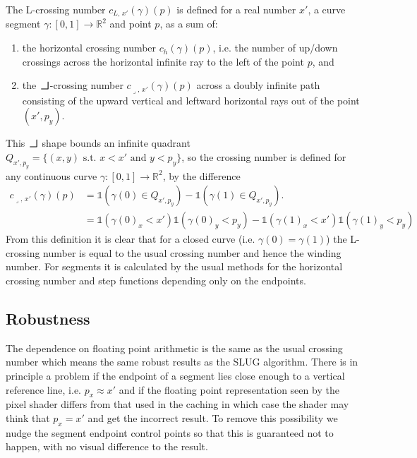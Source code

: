 \documentclass{article}
\newcommand{\backL}{\resizebox{!}{1.7ex}{$\lrcorner$}}
\begin{document}
The L-crossing number $c_{L,\,x'}(\gamma)(p)$ is defined for a real number $x'$, a curve segment $\gamma:[0,1]\rightarrow \mathds{R}^2$ and point $p$, as a sum of:
\begin{enumerate}
    \item the horizontal crossing number $c_h(\gamma)(p)$, i.e. the number of up/down crossings across the horizontal infinite ray to the left of the point $p$, and
    \item the $\backL$-crossing number $c_{\lrcorner, \, x'}(\gamma)(p)$ across a doubly infinite path consisting of the upward vertical and leftward horizontal rays out of the point $(x', p_y)$.
\end{enumerate}
This $\backL$ shape bounds an infinite quadrant $Q_{x', p_y} = \{(x, y) \text{ s.t. } x < x'\text{ and } y < p_y\}$, so the crossing number is defined for any continuous curve $\gamma:[0, 1]\rightarrow \mathds{R}^2$, by the difference
\begin{align*}
    c_{\lrcorner, \, x'}(\gamma)(p) &= \mathds{1}(\gamma(0)\in Q_{x',p_y}) - \mathds{1}(\gamma(1)\in Q_{x',p_y}).\\
    &= \mathds{1}(\gamma(0)_x < x')\mathds{1}(\gamma(0)_y < p_y) - \mathds{1}(\gamma(1)_x < x')\mathds{1}(\gamma(1)_y < p_y)
\end{align*}
From this definition it is clear that for a closed curve (i.e. $\gamma(0)=\gamma(1)$) the L-crossing number is equal to the usual crossing number and hence the winding number.  For segments it is calculated by the usual methods for the horizontal crossing number and step functions depending only on the endpoints.

\subsection{Robustness}
The dependence on floating point arithmetic is the same as the usual crossing number which means the same robust results as the SLUG algorithm.  There is in principle a problem if the endpoint of a segment lies close enough to a vertical reference line, i.e. $p_x \approx x'$ and if the floating point representation seen by the pixel shader differs from that used in the caching in which case the shader may think that $p_x = x'$ and get the incorrect result.
To remove this possibility we nudge the segment endpoint control points so that this is guaranteed not to happen, with no visual difference to the result.



%
%
\end{document}

